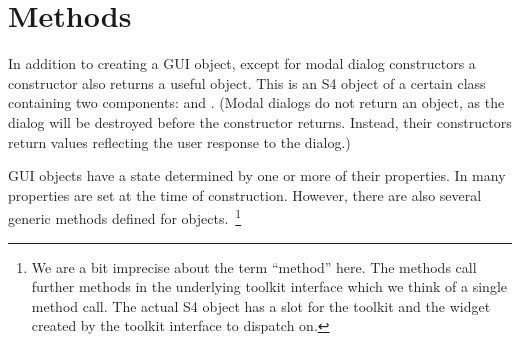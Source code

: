 




\section{Methods}


In addition to creating a GUI object, except for modal dialog
constructors a constructor also returns a useful \R\/ object. This is
an S4 object of a certain class containing two components:
 and . (Modal dialogs do not return an
object, as the dialog will be destroyed before the constructor
returns. Instead, their constructors return values reflecting the user
response to the dialog.)


GUI objects have a state determined by one or more of their
properties. In  many properties are set at the time of
construction. However, there are also several generic methods defined
for  objects.~\footnote{
  We are a bit imprecise about the term ``method'' here. The 
  methods call further methods in the underlying toolkit interface
  which we think of a single method call. The actual S4 object has a
  slot for the toolkit and the widget created by the
  toolkit interface to dispatch on. 
}

